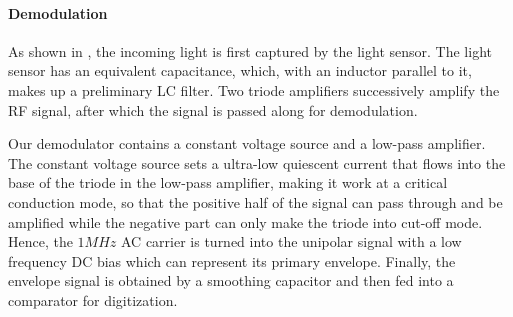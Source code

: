 \paragraph{Demodulation}
As shown in , the incoming light is first captured by the light sensor. 
The light sensor has an equivalent capacitance, which, with an inductor parallel to it, makes up a preliminary LC filter. Two triode amplifiers successively amplify the RF signal, after which the signal is passed along for demodulation. 

Our demodulator contains a constant voltage source and a low-pass amplifier. The constant voltage source sets a ultra-low quiescent current that flows into the base of the triode in the low-pass amplifier, making it work at a critical conduction mode, so that the positive half of the signal can pass through and be amplified while the negative part can only make the triode into cut-off mode. Hence, the $1MHz$ AC carrier is turned into the unipolar signal with a low frequency DC bias which can represent its primary envelope. Finally, the envelope signal is obtained by a smoothing capacitor and then fed into a comparator for digitization. 


